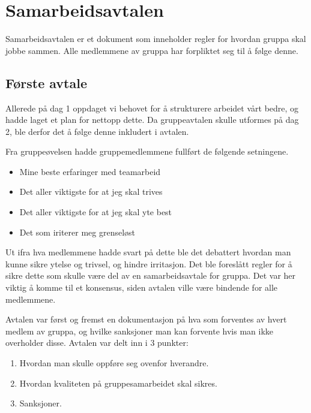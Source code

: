 \section{Samarbeidsavtalen}
Samarbeidsavtalen er et dokument som inneholder regler for hvordan gruppa skal jobbe sammen.
Alle medlemmene av gruppa har forpliktet seg til å følge denne.

\subsection{Første avtale}
Allerede på dag 1 oppdaget vi behovet for å strukturere arbeidet vårt bedre, og hadde laget et plan for nettopp dette.
Da gruppeavtalen skulle utformes på dag 2, ble derfor det å følge denne inkludert i avtalen.

Fra gruppeøvelsen hadde gruppemedlemmene fullført de følgende setningene.
\begin{itemize}
\item Mine beste erfaringer med teamarbeid
\item Det aller viktigste for at jeg skal trives
\item Det aller viktigste for at jeg skal yte best
\item Det som iriterer meg grenseløst
\end{itemize}

Ut ifra hva medlemmene hadde svart på dette ble det debattert hvordan man kunne sikre ytelse og trivsel, og hindre irritasjon.
Det ble foreslått regler for å sikre dette som skulle være del av en samarbeidsavtale for gruppa.
Det var her viktig å komme til et konsensus, siden avtalen ville være bindende for alle medlemmene.

Avtalen var først og fremst en dokumentasjon på hva som forventes av hvert
medlem av gruppa, og hvilke sanksjoner man kan forvente hvis man ikke
overholder disse. Avtalen var delt inn i 3 punkter: 
\begin{enumerate}
	\item Hvordan man skulle oppføre seg ovenfor hverandre.
	\item Hvordan kvaliteten på gruppesamarbeidet skal sikres.
	\item Sanksjoner.
\end{enumerate}

